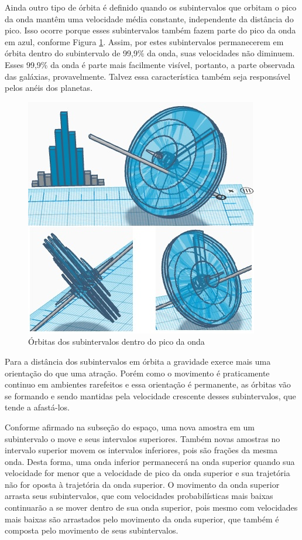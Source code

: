 Ainda outro tipo de órbita é definido quando os subintervalos que orbitam o pico da onda mantêm uma velocidade média constante, independente da distância do pico. Isso ocorre porque esses subintervalos também fazem parte do pico da onda em azul, conforme Figura \ref{fig:consciousness_circular_orbit_system}. Assim, por estes subintervalos permanecerem em órbita dentro do subintervalo de 99,9\% da onda, suas velocidades não diminuem. Esses 99,9\% da onda é parte mais facilmente visível, portanto, a parte observada das galáxias, provavelmente. Talvez essa característica também seja responsável pelos anéis dos planetas. 
	\begin{figure}[H]
	\caption{Órbitas dos subintervalos dentro do pico da onda}
	\label{fig:consciousness_circular_orbit_system}
	\centering
	\includegraphics[scale=.9]{sections/images/consciousness_circular_orbit_system.jpg}
	\end{figure}

Para a distância dos subintervalos em órbita a gravidade exerce mais uma orientação do que uma atração. Porém como o movimento é praticamente continuo em ambientes rarefeitos e essa orientação é permanente, as órbitas vão se formando e sendo mantidas pela velocidade crescente desses subintervalos, que tende a afastá-los. 

Conforme afirmado na subseção do espaço, uma nova amostra em um subintervalo o move e seus intervalos superiores. Também novas amostras no intervalo superior movem os intervalos inferiores, pois são frações da mesma onda. Desta forma, uma onda inferior permanecerá na onda superior quando sua velocidade for menor que a velocidade de pico da onda superior e sua trajetória não for oposta à trajetória da onda superior. O movimento da onda superior arrasta seus subintervalos, que com velocidades probabilísticas mais baixas continuarão a se mover dentro de sua onda superior, pois mesmo com velocidades mais baixas são arrastados pelo movimento da onda superior, que também é composta pelo movimento de seus subintervalos.

